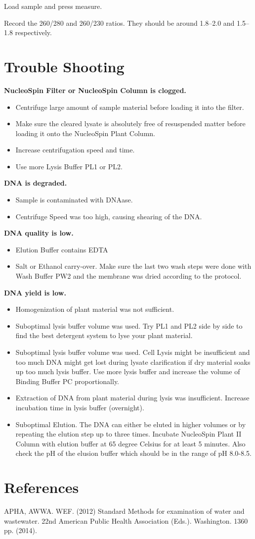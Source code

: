 \documentclass[12pt]{../SOP3_alpha}\usepackage[]{graphicx}\usepackage[]{color}
\begin{document}
\NP Load sample and press measure.

\NP Record the 260/280 and 260/230 ratios. They should be around 1.8--2.0 and 1.5--1.8 respectively. 

\section{Trouble Shooting}

\NP \textbf{NucleoSpin Filter or NucleoSpin Column is clogged.}
\begin{itemize}
  \item Centrifuge large amount of sample material before loading it into the filter.
  \item Make sure the cleared lysate is absolutely free of resuspended matter before loading it onto the NucleoSpin Plant Column.
 \item Increase centrifugation speed and time.
 \item Use more Lysis Buffer PL1 or PL2.
\end{itemize}

\NP \textbf{DNA is degraded.}
\begin{itemize}
  \item Sample is contaminated with DNAase.
  \item Centrifuge Speed was too high, causing shearing of the DNA.
\end{itemize}

\NP \textbf{DNA quality is low.}
\begin{itemize}
  \item Elution Buffer contains EDTA
  \item Salt or Ethanol carry-over. Make sure the last two wash steps were done with Wash Buffer PW2 and the membrane was dried according to the protocol.
\end{itemize}

\NP \textbf{DNA yield is low.}
\begin{itemize}
  \item Homogenization of plant material was not sufficient. 
  \item Suboptimal lysis buffer volume was used. Try PL1 and PL2 side by side to find the best detergent system to lyse your plant material. 
  \item Suboptimal lysis buffer volume was used. Cell Lysis might be insufficient and too much DNA might get lost during lysate clarification if dry material soaks up too much lysis buffer. Use more lysis buffer and increase the volume of Binding Buffer PC proportionally.
  \item Extraction of DNA from plant material during lysis was insufficient. Increase incubation time in lysis buffer (overnight).
  \item Suboptimal Elution. The DNA can either be eluted in higher volumes or by repeating the elution step up to three times. Incubate NucleoSpin Plant II Column with elution buffer at 65 degree Celsius for at least 5 minutes.
Also check the pH of the elusion buffer which should be in the range of pH 8.0-8.5.
\end{itemize}

\section{References}

\NP APHA, AWWA. WEF. (2012) Standard Methods for examination of water and wastewater. 22nd American Public Health Association (Eds.). Washington. 1360 pp. (2014).
\end{document}
